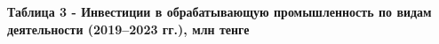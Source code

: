 {\bfseries Таблица 3 - Инвестиции в обрабатывающую промышленность по видам
деятельности (2019--2023 гг.), млн тенге}


